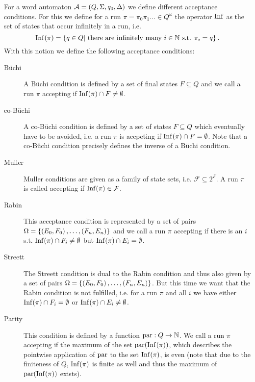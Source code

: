 \begin{definition}
  For a word automaton $\mathcal{A} = \left(Q, \Sigma, q_{0}, \Delta\right)$ we
  define different acceptance conditions. For this we define for a run
  $\pi = \pi_{0}\pi_{1}\dots\in Q^{\omega}$ the operator
  $\operatorname{Inf}$ as the set of states that occur infinitely in a run, i.e.
  \begin{equation*}
    \operatorname{Inf}(\pi) = \left\{q\in Q\middle| \text{ there are infinitely many }
    i\in\mathbb{N} \text{ s.t. } \pi_{i} = q\right\}.
  \end{equation*}
  With this notion we define the following acceptance conditions:
  \begin{description}
    \item [Büchi] A Büchi condition is defined by a set of final states
      $F\subseteq Q$ and we call a run $\pi$ accepting if
      $\operatorname{Inf}(\pi)\cap F\neq\emptyset$.
    \item [co-Büchi] A co-Büchi condition is defined by a set of states
      $F\subseteq Q$ which eventually have to be avoided, i.e. a run $\pi$ is
      accpeting if $\operatorname{Inf}(\pi)\cap F=\emptyset$. Note that a co-Büchi condition
      precisely defines the inverse of a Büchi condition.
    \item [Muller] Muller conditions are given as a family of state sets, i.e.
      $\mathcal{F}\subseteq 2^{F}$. A run $\pi$ is called accepting if
      $\operatorname{Inf}(\pi)\in\mathcal{F}$.
    \item [Rabin] This acceptance condition is represented by a set of pairs\\
      $\Omega = \left\{\left(E_{0}, F_{0}\right), \dots, \left(F_{n}, E_{n}\right)\right\}$ and we
      call a run $\pi$ accepting if there is an $i$ s.t.
      $\operatorname{Inf}(\pi)\cap F_{i}\neq\emptyset$ but $\operatorname{Inf}(\pi)\cap E_{i} = \emptyset$.
    \item [Streett] The Streett condition is dual to the Rabin condition and
      thus also given by a set of pairs
      $\Omega = \left\{\left(E_{0}, F_{0}\right), \dots, \left(F_{n}, E_{n}\right)\right\}$. But
      this time we want that the Rabin condition is not fulfilled, i.e. for a
      run $\pi$ and all $i$ we have either $\operatorname{Inf}(\pi)\cap F_{i} = \emptyset$ or
      $\operatorname{Inf}(\pi)\cap E_{i} \neq \emptyset$.
    \item [Parity] This condition is defined
      by a function
      $\operatorname{par}:Q\rightarrow \mathbb{N}$. We call a run $\pi$ accepting if the
      maximum of the set $\operatorname{par}(\operatorname{Inf}(\pi))$, which describes the pointwise
      application of $\operatorname{par}$ to the set $\operatorname{Inf}(\pi)$, is even (note that due
      to the finiteness of $Q$, $\operatorname{Inf}(\pi)$ is finite as well and thus the
      maximum of $\operatorname{par}(\operatorname{Inf}(\pi))$ exists).
  \end{description}
\end{definition} 
